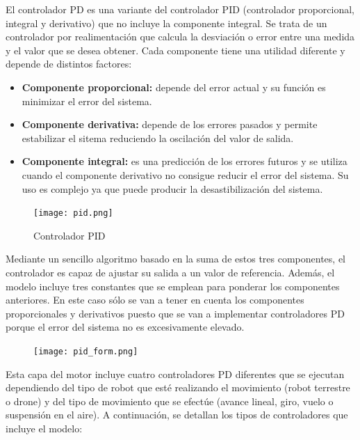 El controlador PD es una variante del controlador PID (controlador proporcional, integral y derivativo) que no incluye la componente integral. Se trata de un controlador por realimentación que calcula la desviación o error entre una medida y el valor que se desea obtener. Cada componente tiene una utilidad diferente y depende de distintos factores:
\begin{itemize}
    \item \textbf{Componente proporcional: }depende del error actual y su función es minimizar el error del sistema.
    \item \textbf{Componente derivativa: }depende de los errores pasados y permite estabilizar el sitema reduciendo la oscilación del valor de salida.
    \item \textbf{Componente integral: }es una predicción de los errores futuros y se utiliza cuando el componente derivativo no consigue reducir el error del sistema. Su uso es complejo ya que puede producir la desastibilización del sistema.
\end{itemize}

\begin{figure}[h!]
    \centering
    \texttt{[image: pid.png]}
    \caption{Controlador PID \footnotemark}
    \label{fig:pid}
\end{figure}

Mediante un sencillo algoritmo basado en la suma de estos tres componentes, el controlador es capaz de ajustar su salida a un valor de referencia. Además, el modelo incluye tres constantes que se emplean para ponderar los componentes anteriores. En este caso sólo se van a tener en cuenta los componentes proporcionales y derivativos puesto que se van a implementar controladores PD  porque el error del sistema no es excesivamente elevado.\newline 

\begin{figure}[h!]
    \centering
    \texttt{[image: pid\_form.png]}
    \label{fig:pid_form}
\end{figure}

Esta capa del motor incluye cuatro controladores PD diferentes que se ejecutan dependiendo del tipo de robot que esté realizando el movimiento (robot terrestre o drone) y del tipo de movimiento que se efectúe (avance lineal, giro, vuelo o suspensión en el aire). A continuación, se detallan los tipos de controladores que incluye el modelo:

